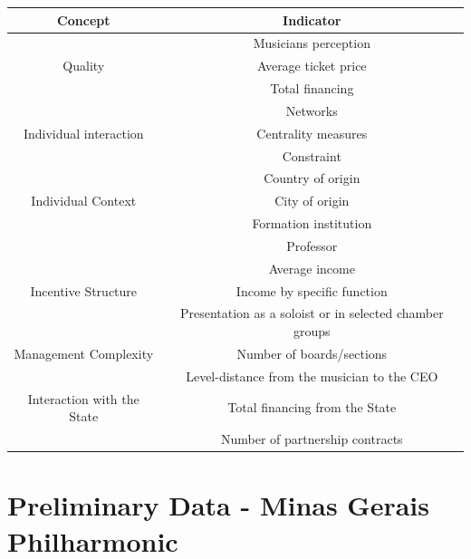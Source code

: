 \documentclass[a4paper, 12pt, openright, oneside, german, french, brazil, english]{abntex2}
\begin{document}
	
	\begin{table}[ht]
		{\begin{tabular}{|c|c|}
				
				\hline
				\textbf{Concept} & \textbf{Indicator} \\
				\hline
				&  Musicians perception \\
				Quality  &  Average ticket price \\
				&  Total financing \\
				\hline
				
				& Networks \\
				Individual interaction & Centrality measures  \\
				& Constraint      \\
				\hline
				& Country of origin  \\
				Individual Context & City of origin  \\
				& Formation institution \\
				& Professor    \\
				\hline
				& Average income  \\
				Incentive Structure & Income by specific function \\
				& Presentation as a soloist or in selected chamber groups \\
				\hline
				Management Complexity  & Number of boards/sections  \\
				& Level-distance from the musician to the CEO \\
				\hline
				Interaction with the State  & Total financing from the State  \\
				& Number of partnership contracts \\
				\hline
				
				
			\end{tabular}
		}
		{}
        \end{table}



        
        \chapter[Preliminary Data]{Preliminary Data - Minas Gerais Philharmonic}
\end{document}
